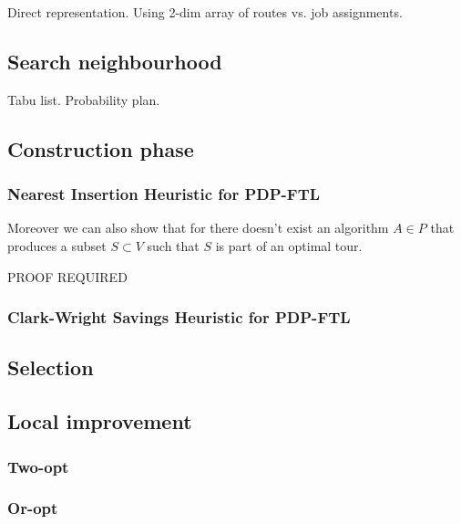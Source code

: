Direct representation. Using 2-dim array of routes vs. job assignments.

\subsection{Search neighbourhood}
Tabu list. Probability plan.


\subsection{Construction phase}

\subsubsection{Nearest Insertion Heuristic for PDP-FTL}

\begin{lemma}
Moreover we can also show that for there doesn't exist an algorithm $A \in P$ that produces a subset $S \subset V$ such that $S$ is part of an optimal tour.
\end{lemma}

PROOF REQUIRED




\subsubsection{Clark-Wright Savings Heuristic for PDP-FTL}


\subsection{Selection}

\subsection{Local improvement}

\subsubsection{Two-opt}

\subsubsection{Or-opt}


